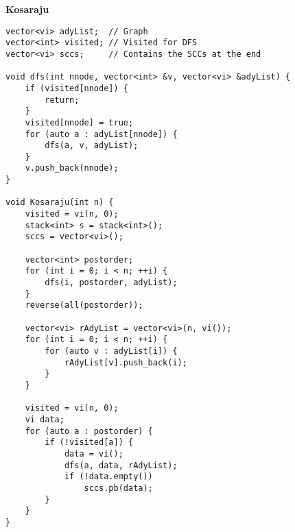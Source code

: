 \documentclass[a4paper,10pt]{article}
\newcommand{\titleAlg}[1]{\vspace{-10pt}
\begin{center}\textbf{#1}\end{center} \vspace{-10pt}}
\begin{document}
\titleAlg{Kosaraju}
\begin{multicols}{2}
\begin{verbatim}
vector<vi> adyList;  // Graph
vector<int> visited; // Visited for DFS
vector<vi> sccs;     // Contains the SCCs at the end

void dfs(int nnode, vector<int> &v, vector<vi> &adyList) {
    if (visited[nnode]) {
        return;
    }
    visited[nnode] = true;
    for (auto a : adyList[nnode]) {
        dfs(a, v, adyList);
    }
    v.push_back(nnode);
}

void Kosaraju(int n) {
    visited = vi(n, 0);
    stack<int> s = stack<int>();
    sccs = vector<vi>();

    vector<int> postorder;
    for (int i = 0; i < n; ++i) {
        dfs(i, postorder, adyList);
    }
    reverse(all(postorder));

    vector<vi> rAdyList = vector<vi>(n, vi());
    for (int i = 0; i < n; ++i) {
        for (auto v : adyList[i]) {
            rAdyList[v].push_back(i);
        }
    }

    visited = vi(n, 0);
    vi data;
    for (auto a : postorder) {
        if (!visited[a]) {
            data = vi();
            dfs(a, data, rAdyList);
            if (!data.empty())
                sccs.pb(data);
        }
    }
}

\end{verbatim}
\end{multicols}
\newpage
\end{document}
